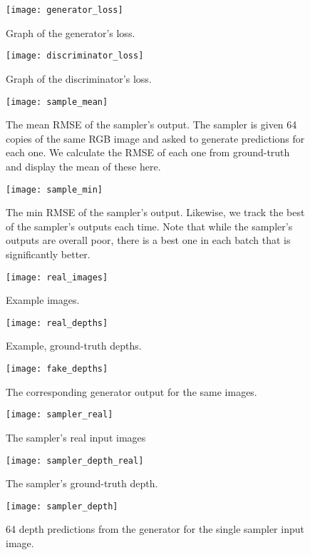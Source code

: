 \documentclass{article}
\begin{document}
\begin{flushleft}
    \begin{figure}
      \texttt{[image: generator\_loss]}
      \caption{Graph of the generator's loss.}
    \end{figure}

    \begin{figure}
      \texttt{[image: discriminator\_loss]}
      \caption{Graph of the discriminator's loss.}
    \end{figure}



  \begin{figure}
    \texttt{[image: sample\_mean]}
    \caption{The mean RMSE of the sampler's output. The sampler is given 64 copies of the same RGB image and asked to generate predictions for each one. We calculate the RMSE of each one from ground-truth and display the mean of these here.}
  \end{figure}

  \begin{figure}
    \texttt{[image: sample\_min]}
    \caption{The min RMSE of the sampler's output. Likewise, we track the best of the sampler's outputs each time. Note that while the sampler's outputs are overall poor, there is a best one in each batch that is significantly better.}
  \end{figure}
  

  \begin{figure}
    \texttt{[image: real\_images]}
    \caption{Example images.}
  \end{figure}

  \begin{figure}
    \texttt{[image: real\_depths]}
    \caption{Example, ground-truth depths.}
  \end{figure}
  
  \begin{figure}
    \texttt{[image: fake\_depths]}
    \caption{The corresponding generator output for the same images.}
  \end{figure}

  \begin{figure}
    \texttt{[image: sampler\_real]}
    \caption{The sampler's real input images}
  \end{figure}

  \begin{figure}
    \texttt{[image: sampler\_depth\_real]}
    \caption{The sampler's ground-truth depth.}
  \end{figure}

  \begin{figure}
    \texttt{[image: sampler\_depth]}
    \caption{64 depth predictions from the generator for the single sampler input image.}
  \end{figure}
    
  
\end{flushleft}
\end{document}

